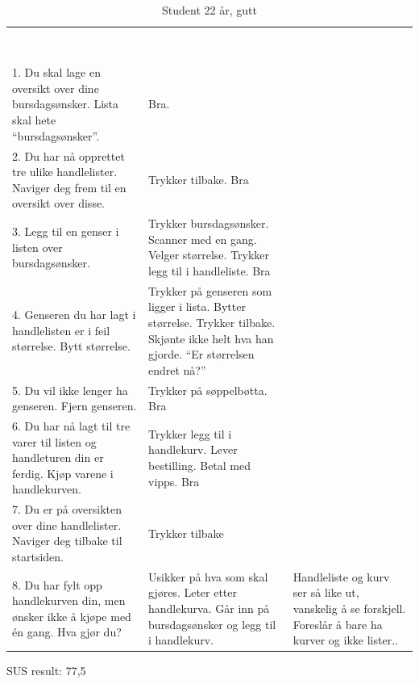 \begin{table}[H]
    \caption{Student 22 år, gutt}
    \label{tab:observasjon1_3}
    \centering
    \begin{tabular}{L{15em}  L{15em} L{15em}}
        \textbf{\textcolor{white}{Task}} & \textbf{\textcolor{white}{Obeservation during execution}} & \textbf{\textcolor{white}{Conversation and discussion}}\\
        1. Du skal lage en oversikt over dine bursdagsønsker. Lista skal hete “bursdagsønsker”. & Bra. & \\
        2. Du har nå opprettet tre ulike handlelister. Naviger deg frem til en oversikt over disse. & Trykker tilbake. Bra &  \\
        3. Legg til en genser i listen over bursdagsønsker. & Trykker bursdagsønsker. Scanner med en gang. Velger størrelse. Trykker legg til i handleliste. Bra & \\
        4. Genseren du har lagt i handlelisten er i feil størrelse. Bytt størrelse. & Trykker på genseren som ligger i lista. Bytter størrelse. Trykker tilbake. Skjønte ikke helt hva han gjorde. “Er størrelsen endret nå?” & \\
        5. Du vil ikke lenger ha genseren. Fjern genseren. & Trykker på søppelbøtta. Bra & \\
        6. Du har nå lagt til tre varer til listen og handleturen din er ferdig. Kjøp varene i handlekurven. & Trykker legg til i handlekurv. Lever bestilling. Betal med vipps. Bra & \\
        7. Du er på oversikten over dine handlelister. Naviger deg tilbake til startsiden. & Trykker tilbake & \\
        8. Du har fylt opp handlekurven din, men ønsker ikke å kjøpe med én gang. Hva gjør du? & Usikker på hva som skal gjøres. Leter etter handlekurva. Går inn på bursdagsønsker og legg til i handlekurv. & Handleliste og kurv ser så like ut, vanskelig å se forskjell. Foreslår å bare ha kurver og ikke lister..\\
    \end{tabular}
\end{table}

\noindent SUS result: 77,5

